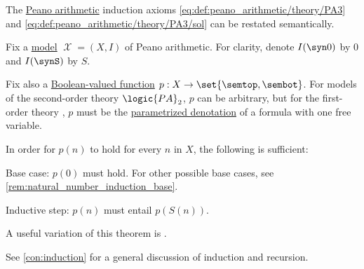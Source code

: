 \begin{theorem}\label{thm:induction_on_natural_numbers}
  The \hyperref[def:peano_arithmetic]{Peano arithmetic} induction axioms \eqref{eq:def:peano_arithmetic/theory/PA3} and \eqref{eq:def:peano_arithmetic/theory/PA3/sol} can be restated semantically.

  Fix a \hyperref[def:fol_semantics/model]{model} \( \mscrX = (X, I) \) of Peano arithmetic. For clarity, denote \( I(\syn0) \) by \( 0 \) and \( I(\synS) \) by \( S \).

  Fix also a \hyperref[def:boolean_function]{Boolean-valued function} \( p: X \to \set{ \semtop, \sembot } \). For models of the second-order theory \( \logic{PA}_2 \), \( p \) can be arbitrary, but for the first-order theory , \( p \) must be the \hyperref[def:fol_parameterized_formula_denotation]{parametrized denotation} of a formula with one free variable.

  In order for \( p(n) \) to hold for every \( n \) in \( X \), the following is sufficient:
  \begin{thmenum}
     Base case: \( p(0) \) must hold. For other possible base cases, see \cref{rem:natural_number_induction_base}.

     Inductive step: \( p(n) \) must entail \( p(S(n)) \).
  \end{thmenum}
\end{theorem}
\begin{comments}
  \item A useful variation of this theorem is .

  See \cref{con:induction} for a general discussion of induction and recursion.
\end{comments}
